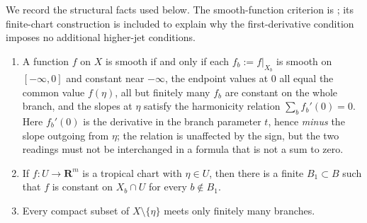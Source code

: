 We record the structural facts used below. The smooth-function criterion
is \cite[Example~6.7.3]{CLD25}; its finite-chart construction is included
to explain why the first-derivative condition imposes no additional
higher-jet conditions.

\begin{lemma}
\label{lem:ch14-star-smooth}
\begin{enumerate}
\item A function $f$ on $X$ is smooth if and only if each $f_b:=f|_{X_b}$ is
  smooth on $[-\infty,0]$ and constant near $-\infty$, the endpoint
  values at $0$ all equal the common value $f(\eta)$, all but finitely many
  $f_b$ are constant on the whole branch, and the slopes at $\eta$ satisfy
  the harmonicity relation $\sum_bf_b'(0)=0$.  Here $f_b'(0)$ is the
  derivative in the branch parameter $t$, hence \emph{minus} the slope
  outgoing from $\eta$; the relation is unaffected by the sign, but the two
  readings must not be interchanged in a formula that is not a sum to
  zero.
\item If $f:U\to\mathbf R^m$ is a tropical chart with $\eta\in U$, then there
  is a finite $B_1\subset B$ such that $f$ is constant on $X_b\cap U$ for
  every $b\notin B_1$.
\item Every compact subset of $X\setminus\{\eta\}$ meets only finitely many
  branches.
\end{enumerate}
\end{lemma}


